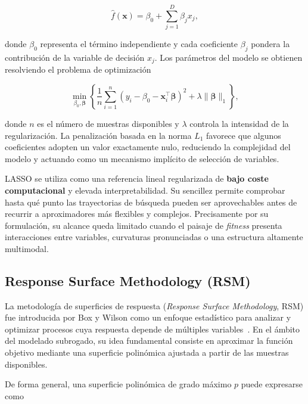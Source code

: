 \begin{equation}
    \hat{f}(\mathbf{x})
    =
    \beta_0
    +
    \sum_{j=1}^{D}
    \beta_j x_j,
\end{equation}

donde \(\beta_0\) representa el término independiente y cada coeficiente \(\beta_j\) pondera la contribución de la variable de decisión \(x_j\). Los parámetros del modelo se obtienen resolviendo el problema de optimización

\begin{equation}
    \min_{\beta_0,\boldsymbol{\beta}}
    \left\{
    \frac{1}{n}
    \sum_{i=1}^{n}
    \left(
    y_i - \beta_0 - \mathbf{x}_i^\top \boldsymbol{\beta}
    \right)^2
    +
    \lambda
    \lVert \boldsymbol{\beta} \rVert_1
    \right\},
\end{equation}

donde \(n\) es el número de muestras disponibles y \(\lambda\) controla la intensidad de la regularización. La penalización basada en la norma \(L_1\) favorece que algunos coeficientes adopten un valor exactamente nulo, reduciendo la complejidad del modelo y actuando como un mecanismo implícito de selección de variables.

LASSO se utiliza como una referencia lineal regularizada de \textbf{bajo coste computacional} y elevada interpretabilidad. Su sencillez permite comprobar hasta qué punto las trayectorias de búsqueda pueden ser aprovechables antes de recurrir a aproximadores más flexibles y complejos. Precisamente por su formulación, su alcance queda limitado cuando el paisaje de \textit{fitness} presenta interacciones entre variables, curvaturas pronunciadas o una estructura altamente multimodal.


\subsection{Response Surface Methodology (RSM)}

La metodología de superficies de respuesta (\textit{Response Surface Methodology}, RSM) fue introducida por Box y Wilson como un enfoque estadístico para analizar y optimizar procesos cuya respuesta depende de múltiples variables~\cite{box1951experimental}. En el ámbito del modelado subrogado, su idea fundamental consiste en aproximar la función objetivo mediante una superficie polinómica ajustada a partir de las muestras disponibles.

De forma general, una superficie polinómica de grado máximo \(p\) puede expresarse como

